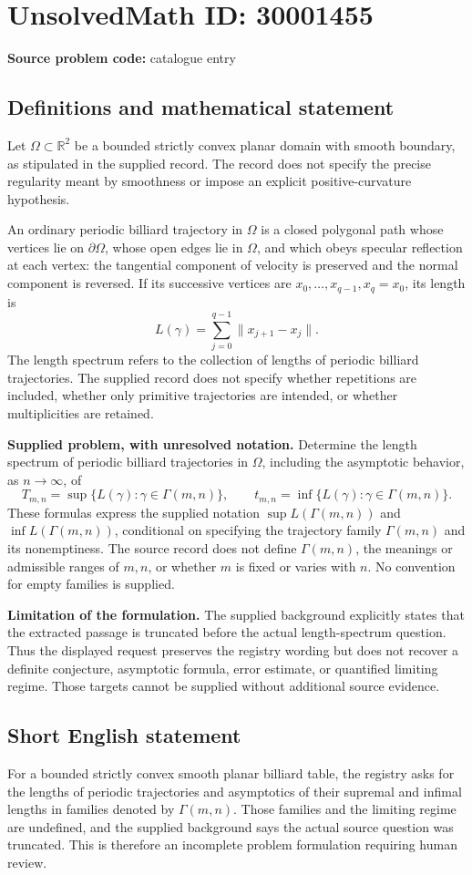 \documentclass[11pt]{article}
\newcommand{\R}{\mathbb{R}}
\begin{document}
\section*{UnsolvedMath ID: 30001455}
\textbf{Source problem code:} catalogue entry
\subsection{Definitions and mathematical statement}
Let \(\Omega\subset\R^2\) be a bounded strictly convex planar domain with smooth boundary, as stipulated in the supplied record. The record does not specify the precise regularity meant by smoothness or impose an explicit positive-curvature hypothesis.

An ordinary periodic billiard trajectory in \(\Omega\) is a closed polygonal path whose vertices lie on \(\partial\Omega\), whose open edges lie in \(\Omega\), and which obeys specular reflection at each vertex: the tangential component of velocity is preserved and the normal component is reversed. If its successive vertices are \(x_0,\ldots,x_{q-1},x_q=x_0\), its length is
\[
L(\gamma)=\sum_{j=0}^{q-1}\lVert x_{j+1}-x_j\rVert.
\]
The length spectrum refers to the collection of lengths of periodic billiard trajectories. The supplied record does not specify whether repetitions are included, whether only primitive trajectories are intended, or whether multiplicities are retained.

\textbf{Supplied problem, with unresolved notation.} Determine the length spectrum of periodic billiard trajectories in \(\Omega\), including the asymptotic behavior, as \(n\to\infty\), of
\[
T_{m,n}=\sup\{L(\gamma):\gamma\in\Gamma(m,n)\},
\qquad
t_{m,n}=\inf\{L(\gamma):\gamma\in\Gamma(m,n)\}.
\]
These formulas express the supplied notation \(\sup L(\Gamma(m,n))\) and \(\inf L(\Gamma(m,n))\), conditional on specifying the trajectory family \(\Gamma(m,n)\) and its nonemptiness. The source record does not define \(\Gamma(m,n)\), the meanings or admissible ranges of \(m,n\), or whether \(m\) is fixed or varies with \(n\). No convention for empty families is supplied.

\textbf{Limitation of the formulation.} The supplied background explicitly states that the extracted passage is truncated before the actual length-spectrum question. Thus the displayed request preserves the registry wording but does not recover a definite conjecture, asymptotic formula, error estimate, or quantified limiting regime. Those targets cannot be supplied without additional source evidence.
\subsection{Short English statement}
For a bounded strictly convex smooth planar billiard table, the registry asks for the lengths of periodic trajectories and asymptotics of their supremal and infimal lengths in families denoted by \(\Gamma(m,n)\). Those families and the limiting regime are undefined, and the supplied background says the actual source question was truncated. This is therefore an incomplete problem formulation requiring human review.
\end{document}
